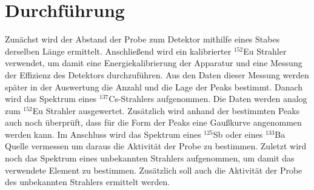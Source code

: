 
\section{Durchführung}
\label{sec:Durchführung}
Zunächst wird der Abstand der Probe zum Detektor mithilfe eines Stabes derselben Länge ermittelt. Anschließend wird ein kalibrierter $^{152}$Eu Strahler verwendet, um damit eine Energiekalibrierung der Apparatur und eine Messung der Effizienz des Detektors durchzuführen. Aus den Daten dieser Messung werden später in der Auswertung die Anzahl und die Lage der Peaks bestimmt. Danach wird das Spektrum eines $^{137}$Cs-Strahlers aufgenommen. Die Daten werden analog zum $^{152}$Eu Strahler ausgewertet. Zusätzlich wird anhand der bestimmten Peaks auch noch überprüft, dass für die Form der Peaks eine Gaußkurve angenommen werden kann. Im Anschluss wird das Spektrum eines $^{125}$Sb oder eines $^{133}$Ba Quelle vermessen um daraus die Aktivität der Probe zu bestimmen. Zuletzt wird noch das Spektrum eines unbekannten Strahlers aufgenommen, um damit das verwendete Element zu bestimmen. Zusätzlich soll auch die Aktivität der Probe des unbekannten Strahlers ermittelt werden.